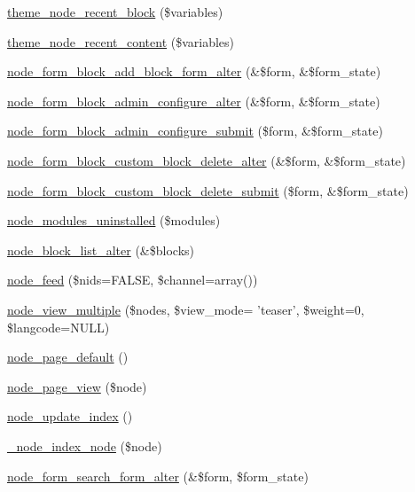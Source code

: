 \begin{DoxyCompactItemize}
\item 
\hyperlink{group__themeable_gabb27be326bca09218e6e44048127c8e3}{theme\_\-node\_\-recent\_\-block} (\$variables)
\item 
\hyperlink{group__themeable_ga97f48d53d3d8c179a80d67fe24a85a55}{theme\_\-node\_\-recent\_\-content} (\$variables)
\item 
\hyperlink{node_8module_a73bfd97257bcdd429f8fab27ec5dbcea}{node\_\-form\_\-block\_\-add\_\-block\_\-form\_\-alter} (\&\$form, \&\$form\_\-state)
\item 
\hyperlink{node_8module_aa7774912602cb998d0ab075802165345}{node\_\-form\_\-block\_\-admin\_\-configure\_\-alter} (\&\$form, \&\$form\_\-state)
\item 
\hyperlink{node_8module_ad665eaeb7a14a6cea1385cf3293241b8}{node\_\-form\_\-block\_\-admin\_\-configure\_\-submit} (\$form, \&\$form\_\-state)
\item 
\hyperlink{node_8module_adeb6930eb48582c58ccf8ae089e70cfc}{node\_\-form\_\-block\_\-custom\_\-block\_\-delete\_\-alter} (\&\$form, \&\$form\_\-state)
\item 
\hyperlink{node_8module_a74bc394aa69fc202e9da416d717d6cd2}{node\_\-form\_\-block\_\-custom\_\-block\_\-delete\_\-submit} (\$form, \&\$form\_\-state)
\item 
\hyperlink{node_8module_a66de7f3493edd4a5e015a48a31992e0a}{node\_\-modules\_\-uninstalled} (\$modules)
\item 
\hyperlink{node_8module_ab6bd10a5b0559113f2b32f84c35b58cf}{node\_\-block\_\-list\_\-alter} (\&\$blocks)
\item 
\hyperlink{node_8module_acad30bd6d2afbf584f622957c8f4718f}{node\_\-feed} (\$nids=FALSE, \$channel=array())
\item 
\hyperlink{node_8module_a2296e973f0df6c4c1961891b05c0d5d4}{node\_\-view\_\-multiple} (\$nodes, \$view\_\-mode= 'teaser', \$weight=0, \$langcode=NULL)
\item 
\hyperlink{node_8module_a8886b7d16fd0bae8b3ff89193c52d3cf}{node\_\-page\_\-default} ()
\item 
\hyperlink{node_8module_ae409793704d24e41aee23db5d7933231}{node\_\-page\_\-view} (\$node)
\item 
\hyperlink{node_8module_a4310054ba3c28aad3c32f497898fb744}{node\_\-update\_\-index} ()
\item 
\hyperlink{node_8module_a18866988a8ff7ed81fb0edda6d1b9d97}{\_\-node\_\-index\_\-node} (\$node)
\item 
\hyperlink{node_8module_aafba59926e9d0a8e6f81cbb776cba7ef}{node\_\-form\_\-search\_\-form\_\-alter} (\&\$form, \$form\_\-state)

\end{DoxyCompactItemize}
